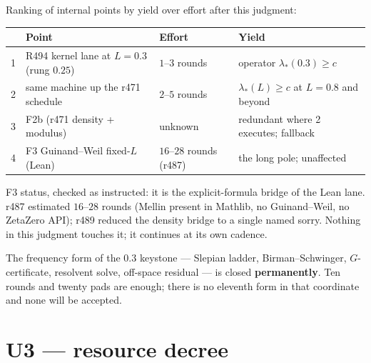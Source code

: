 \documentclass[11pt]{article}
\theoremstyle{remark}
\begin{document}
Ranking of internal points by yield over effort after this
judgment:

\begin{center}
\small
\begin{tabular}{@{}rlll@{}}
\toprule
& Point & Effort & Yield \\
\midrule
1 & R494 kernel lane at $L=0.3$ (rung $0.25$)
  & $1$--$3$ rounds
  & operator $\lambda_*(0.3)\ge c$ \\
2 & same machine up the r471 schedule
  & $2$--$5$ rounds
  & $\lambda_*(L)\ge c$ at $L=0.8$ and beyond \\
3 & F2b (r471 density + modulus)
  & unknown
  & redundant where 2 executes; fallback \\
4 & F3 Guinand--Weil fixed-$L$ (Lean)
  & $16$--$28$ rounds (r487)
  & the long pole; unaffected \\
\bottomrule
\end{tabular}
\end{center}

F3 status, checked as instructed: it is the explicit-formula
bridge of the Lean lane.  r487 estimated $16$--$28$ rounds
(Mellin present in Mathlib, no Guinand--Weil, no ZetaZero API);
r489 reduced the density bridge to a single named sorry.
Nothing in this judgment touches it; it continues at its own
cadence.

The frequency form of the $0.3$ keystone --- Slepian ladder,
Birman--Schwinger, $G$-certificate, resolvent solve, off-space
residual --- is closed \textbf{permanently}.  Ten rounds and
twenty pads are enough; there is no eleventh form in that
coordinate and none will be accepted.

\section{U3 --- resource decree}\label{sec:u3}
\end{document}
